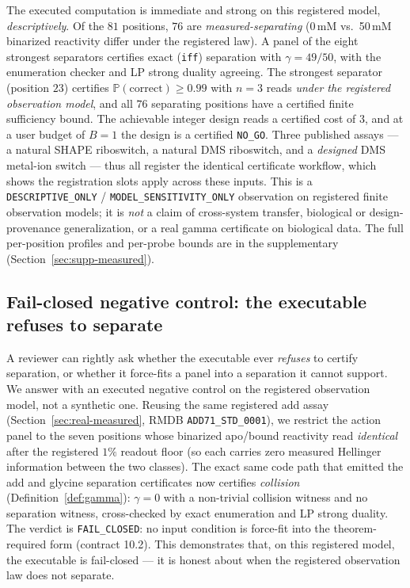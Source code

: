 \documentclass[11pt]{article}
\begin{document}
The executed computation is immediate and strong on this registered model, \emph{descriptively}. Of the
$81$ positions, $76$ are \emph{measured-separating} (0\,mM vs.\ 50\,mM binarized reactivity differ under
the registered law). A panel of the eight strongest separators certifies exact (\texttt{iff}) separation
with $\gamma=49/50$, with the enumeration checker and LP strong duality agreeing. The strongest
separator (position $23$) certifies $\mathbb{P}(\mathrm{correct})\ge0.99$ with $n=3$ reads
\emph{under the registered observation model}, and all $76$ separating positions have a certified finite
sufficiency bound. The achievable integer design reads a certified cost of $3$, and at a user budget of
$B=1$ the design is a certified \texttt{NO\_GO}. Three published assays --- a natural SHAPE riboswitch,
a natural DMS riboswitch, and a \emph{designed} DMS metal-ion switch --- thus all register the identical
certificate workflow, which shows the registration slots apply across these inputs. This is a
\texttt{DESCRIPTIVE\_ONLY} / \texttt{MODEL\_SENSITIVITY\_ONLY} observation on registered finite
observation models; it is \emph{not} a claim of cross-system transfer, biological or design-provenance
generalization, or a real gamma certificate on biological data. The full per-position profiles and
per-probe bounds are in the supplementary (Section~\ref{sec:supp-measured}).

\subsection{Fail-closed negative control: the executable refuses to separate}\label{sec:real-negative}
A reviewer can rightly ask whether the executable ever \emph{refuses} to certify separation, or
whether it force-fits a panel into a separation it cannot support. We answer with an executed negative
control on the registered observation model, not a synthetic one. Reusing the same registered add assay
(Section~\ref{sec:real-measured}, RMDB \texttt{ADD71\_STD\_0001}), we restrict the action panel to the
seven positions whose binarized apo/bound reactivity read \emph{identical} after the registered $1\%$
readout floor (so each carries zero measured Hellinger information between the two classes). The exact
same code path that emitted the add and glycine separation certificates now certifies \emph{collision}
(Definition~\ref{def:gamma}): $\gamma=0$ with a non-trivial collision witness and no separation witness,
cross-checked by exact enumeration and LP strong duality. The verdict is \texttt{FAIL\_CLOSED}: no input
condition is force-fit into the theorem-required form (contract 10.2). This demonstrates that, on this
registered model, the executable is fail-closed --- it is honest about when the registered observation
law does not separate.
\end{document}
